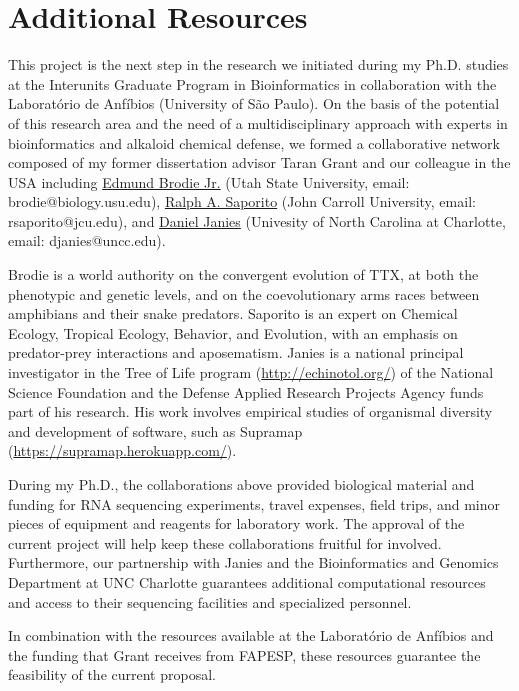 \section{Additional Resources}

This project is the next step in the research we initiated during my Ph.D. studies at the Interunits Graduate Program in Bioinformatics in collaboration with the Laboratório de Anfíbios (University of São Paulo). On the basis of the potential of this research area and the need of a multidisciplinary approach with experts in bioinformatics and alkaloid chemical defense, we formed a collaborative network composed of my former dissertation advisor Taran Grant and our colleague in the USA including \href{http://www.biology.usu.edu/about/faculty/edmund-brodie}{Edmund Brodie Jr.} (Utah State University, email: brodie@biology.usu.edu), \href{http://sites.jcu.edu/biology/professor/ralph-a-saporito/}{Ralph A. Saporito} (John Carroll University, email: rsaporito@jcu.edu), and \href{https://cci.uncc.edu/directory/janies-daniel}{Daniel Janies} (Univesity of North Carolina at Charlotte, email: djanies@uncc.edu).

Brodie is a world authority on the convergent evolution of TTX, at both the phenotypic and genetic levels, and on the coevolutionary arms races between amphibians and their snake predators. Saporito is an expert on Chemical Ecology, Tropical Ecology, Behavior, and Evolution, with an emphasis on predator-prey interactions and aposematism. Janies is a national principal investigator in the Tree of Life program (\href{http://echinotol.org/}{http://echinotol.org/}) of the National Science Foundation and the Defense Applied Research Projects Agency funds part of his research. His work involves empirical studies of organismal diversity and development of software, such as Supramap (\href{https://supramap.herokuapp.com/}{https://supramap.herokuapp.com/}).

During my Ph.D., the collaborations above provided biological material and funding for RNA sequencing experiments, travel expenses, field trips, and minor pieces of equipment and reagents for laboratory work. The approval of the current project will help keep these collaborations fruitful for involved. Furthermore, our partnership with Janies and the Bioinformatics and Genomics Department at UNC Charlotte guarantees additional computational resources and access to their sequencing facilities and specialized personnel.

In combination with the resources available at the Laboratório de Anfíbios and the funding that Grant receives from FAPESP, these resources guarantee the feasibility of the current proposal.